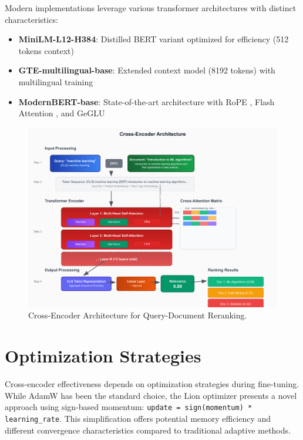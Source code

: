 Modern implementations leverage various transformer architectures with distinct characteristics:
\begin{itemize}
\item \textbf{MiniLM-L12-H384}: Distilled BERT variant optimized for efficiency \cite{wang2020minilm} (512 tokens context)
\item \textbf{GTE-multilingual-base}: Extended context model (8192 tokens) with multilingual training \cite{li2023towards}
\item \textbf{ModernBERT-base}: State-of-the-art architecture with RoPE \cite{su2023roformerenhancedtransformerrotary}, Flash Attention \cite{dao2022flashattentionfastmemoryefficientexact}, and GeGLU \cite{shazeer2020gluvariantsimprovetransformer} \cite{modernbert}
\end{itemize}

\begin{figure}[!htp]
    \centering
    \includegraphics[width=\textwidth, keepaspectratio]{Figures/cross_encoder_archi.png}
    \caption{Cross-Encoder Architecture for Query-Document Reranking.}
    \label{fig:Cross-Encoder-Architecture}
\end{figure}

\section{Optimization Strategies}

Cross-encoder effectiveness depends on optimization strategies during fine-tuning. While AdamW \cite{loshchilov2019decoupled} has been the standard choice, the Lion optimizer \cite{chen2023symbolic} presents a novel approach using sign-based momentum: \texttt{update = sign(momentum) * learning\_rate}. This simplification offers potential memory efficiency and different convergence characteristics compared to traditional adaptive methods.

